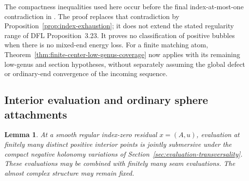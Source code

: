 \documentclass[11pt]{amsart}
\newtheorem{lemma}[theorem]{Lemma}
\theoremstyle{definition}
\theoremstyle{remark}
\theoremstyle{plain}
\begin{document}
The compactness inequalities used here occur before the
final index-at-most-one contradiction in
\cite[Section~5.4, pp.~71--74]{DaeFukLip21a}.
The proof replaces that contradiction by
Proposition~\ref{prop:index-exhaustion}; it does not extend
the stated regularity range of DFL Proposition~3.23.
It proves no classification of positive bubbles when there
is no mixed-end energy loss. For a finite matching atom,
Theorem~\ref{thm:finite-center-low-genus-coverage} now applies
with its remaining low-genus and section hypotheses, without
separately assuming the global defect or ordinary-end
convergence of the incoming sequence.

\subsection{Interior evaluation and ordinary sphere attachments}
\label{sec:interior-sphere-evaluation}

\begin{lemma}\label{lem:positive-interior-evaluation}
At a smooth regular index-zero residual $x=(A,u)$, evaluation
at finitely many distinct positive interior points is jointly
submersive under the compact negative holonomy variations of
Section~\ref{sec:evaluation-transversality}.
These evaluations may be combined with finitely many seam
evaluations. The almost complex structure may remain fixed.
\end{lemma}
\end{document}
